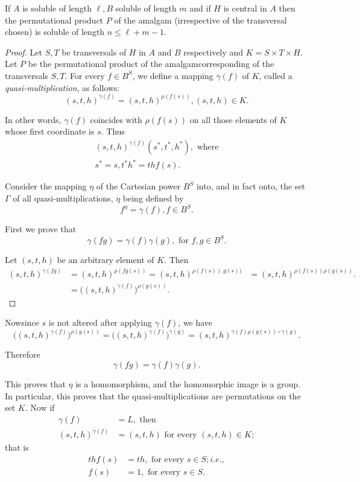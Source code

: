 \begin{theorem}\label{chap11:sec3:thm3}%
  If $A$ is soluble of length $\ell,B$ soluble of length $m$ and if
  $H$ is central in $A$ then the permutational product $P$ of the
  amalgam (irrespective of the transversal chosen) is soluble of
  length $n \leq \ell+ m-1$. 
\end{theorem}

\begin{proof}
  Let $S,T$ be transversals of $H$ in $A$ and $B$ respectively and
  $K=S \times T \times H$. Let $P$ be the permutational product of the
  amalgam\pageoriginale corresponding of the transversals $S,T$. For every $f \in
  B^S$, we define a mapping $\gamma (f)$ of $K$, called a {\em
    quasi-multiplication}, as follows: 
  $$
  (s,t,h)^{\gamma(f)}=(s,t,h)^{\rho(f(s))},(s,t,h)\in K.
  $$

  In other words, $\gamma (f)$ coincides with $\rho (f(s))$ on all
  those elements of $K$ whose first coordinate is $s$. Thus  
  \begin{gather*}
    (s,t,h)^{\gamma(f)}(s^*,t^*,h^*), \text{ where}\\
    s^*=s,t^*h^*=thf(s).
  \end{gather*}

  Consider the mapping $\eta$ of the Cartesian power $B^S$ into, and
  in fact onto, the set $\Gamma$ of all quasi-multiplications, $\eta$
  being defined by 
  $$
  f^ \eta= \gamma(f),f \in  B^S.
  $$

  First we prove that
  $$
  \gamma (fg)=\gamma (f) \gamma(g), \text{ for } f,g \in  B^S.
  $$

  Let $(s,t,h)$ be an arbitrary element of $K$. Then
  \begin{align*}
    (s,t,h)^{\gamma(fg)} &=(s,t,h)^{\rho(fg(s))}= (s,t,h)^{\rho(f(s)).g(s))}
    &= (s,t,h)^{\rho (f(s)) \rho(g(s))}. \\
    &= \bigg ( (s,t,h)^{\gamma(f)} \bigg) ^{\rho(g(s))}.
  \end{align*}
\end{proof}

Now\pageoriginale since $s$ is not altered after applying $\gamma(f)$, we have
$$
\bigg ( (s,t,h)^{\gamma(f)} \bigg) ^{\rho(g(s))}=\bigg (
(s,t,h)^{\gamma(f)} \bigg) ^{\gamma(g)}= (s,t,h)^{\gamma(f)\rho(g(s))\circ
  \gamma(g)}. 
$$

Therefore
$$
\gamma(fg)=\gamma(f) \gamma(g).
$$

This proves that $\eta$ is a homomorphism, and the homomorphic image
is a group. In particular, this proves that the quasi-multiplications
are permutations on the set $K$. Now if 
\begin{align*}
  \gamma(f) &= L, \text{ then }\\
  (s,t,h)^{\gamma(f)} &=(s,t,h) \text{ for every } (s,t,h) \in  K;
\end{align*}
that is 
\begin{align*}
  thf(s)& = th, \text{ for every } s \in  S; i.e.,\\
  f(s)& = 1, \text{ for every } s \in  S.
\end{align*}

